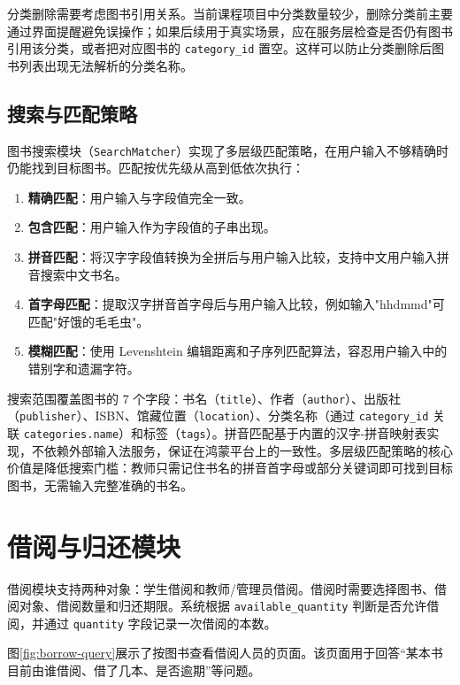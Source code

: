 分类删除需要考虑图书引用关系。当前课程项目中分类数量较少，删除分类前主要通过界面提醒避免误操作；如果后续用于真实场景，应在服务层检查是否仍有图书引用该分类，或者把对应图书的 \texttt{category\_id} 置空。这样可以防止分类删除后图书列表出现无法解析的分类名称。

\subsection{搜索与匹配策略}

图书搜索模块（\texttt{SearchMatcher}）实现了多层级匹配策略，在用户输入不够精确时仍能找到目标图书。匹配按优先级从高到低依次执行：

\begin{enumerate}
    \item \textbf{精确匹配}：用户输入与字段值完全一致。
    \item \textbf{包含匹配}：用户输入作为字段值的子串出现。
    \item \textbf{拼音匹配}：将汉字字段值转换为全拼后与用户输入比较，支持中文用户输入拼音搜索中文书名。
    \item \textbf{首字母匹配}：提取汉字拼音首字母后与用户输入比较，例如输入"hhdmmd"可匹配"好饿的毛毛虫"。
    \item \textbf{模糊匹配}：使用 Levenshtein 编辑距离\cite{levenshtein1966}和子序列匹配算法，容忍用户输入中的错别字和遗漏字符。
\end{enumerate}

搜索范围覆盖图书的 7 个字段：书名（\texttt{title}）、作者（\texttt{author}）、出版社（\texttt{publisher}）、ISBN、馆藏位置（\texttt{location}）、分类名称（通过 \texttt{category\_id} 关联 \texttt{categories.name}）和标签（\texttt{tags}）。拼音匹配基于内置的汉字-拼音映射表实现，不依赖外部输入法服务，保证在鸿蒙平台上的一致性。多层级匹配策略的核心价值是降低搜索门槛：教师只需记住书名的拼音首字母或部分关键词即可找到目标图书，无需输入完整准确的书名。

\section{借阅与归还模块}

借阅模块支持两种对象：学生借阅和教师/管理员借阅。借阅时需要选择图书、借阅对象、借阅数量和归还期限。系统根据 \texttt{available\_quantity} 判断是否允许借阅，并通过 \texttt{quantity} 字段记录一次借阅的本数。

图\ref{fig:borrow-query}展示了按图书查看借阅人员的页面。该页面用于回答“某本书目前由谁借阅、借了几本、是否逾期”等问题。

